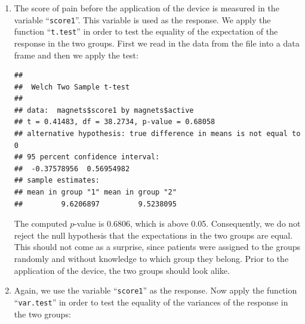\documentclass[]{krantz}
\makeatletter
\newenvironment{Shaded}{\begin{snugshade}}{\end{snugshade}}
\newcommand{\KeywordTok}[1]{\textcolor[rgb]{0.13,0.29,0.53}{\textbf{#1}}}
\newcommand{\NormalTok}[1]{#1}
\newcommand{\OperatorTok}[1]{\textcolor[rgb]{0.81,0.36,0.00}{\textbf{#1}}}
\newcommand{\StringTok}[1]{\textcolor[rgb]{0.31,0.60,0.02}{#1}}
\newenvironment{kframe}{%
\medskip{}
\setlength{\fboxsep}{.8em}
 \def\at@end@of@kframe{}%
 \ifinner\ifhmode%
  \def\at@end@of@kframe{\end{minipage}}%
  \begin{minipage}{\columnwidth}%
 \fi\fi%
 \def\FrameCommand##1{\hskip\@totalleftmargin \hskip-\fboxsep
 \colorbox{shadecolor}{##1}\hskip-\fboxsep
     \hskip-\linewidth \hskip-\@totalleftmargin \hskip\columnwidth}%
 \MakeFramed {\advance\hsize-\width
   \@totalleftmargin\z@ \linewidth\hsize
   \@setminipage}}%
 {\par\unskip\endMakeFramed%
 \at@end@of@kframe}
\renewenvironment{Shaded}{\begin{kframe}}{\end{kframe}}
\theoremstyle{definition}
\theoremstyle{definition}
\theoremstyle{definition}
\theoremstyle{remark}
\makeatother
\begin{document}
\begin{enumerate}
\def\labelenumi{\arabic{enumi}.}
\item
  The score of pain before the
  application of the device is measured in the variable ``\texttt{score1}''. This
  variable is used as the response. We apply the function ``\texttt{t.test}'' in
  order to test the equality of the expectation of the response in the two
  groups. First we read in the data from the file into a data frame and
  then we apply the test:

\begin{Shaded}
\end{Shaded}

\begin{verbatim}
## 
##  Welch Two Sample t-test
## 
## data:  magnets$score1 by magnets$active
## t = 0.41483, df = 38.2734, p-value = 0.68058
## alternative hypothesis: true difference in means is not equal to 0
## 95 percent confidence interval:
##  -0.37578956  0.56954982
## sample estimates:
## mean in group "1" mean in group "2" 
##         9.6206897         9.5238095
\end{verbatim}

  The computed \(p\)-value is 0.6806, which is above 0.05. Consequently, we
  do not reject the null hypothesis that the expectations in the two
  groups are equal. This should not come as a surprise, since patients
  were assigned to the groups randomly and without knowledge to which
  group they belong. Prior to the application of the device, the two
  groups should look alike.
\item
  Again, we use the variable ``\texttt{score1}''
  as the response. Now apply the function ``\texttt{var.test}'' in order to test
  the equality of the variances of the response in the two groups:

\begin{Shaded}
\end{Shaded}


\end{enumerate}
\end{document}
